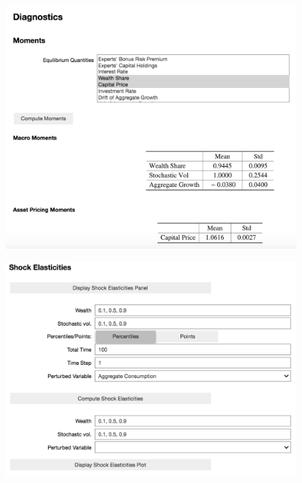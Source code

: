 \documentclass[12pt]{article}
\begin{document}
\begin{figure}[H]
\centering
\begin{minipage}{.5\textwidth}
  \centering
\includegraphics[scale=0.3]{moments}
  \label{fig:compMoments}
\end{minipage}%
\begin{minipage}{.5\textwidth}
  \centering
\includegraphics[scale=0.3]{shockelas}
  \label{fig:compElas}
\end{minipage}
\end{figure}
\end{document}
